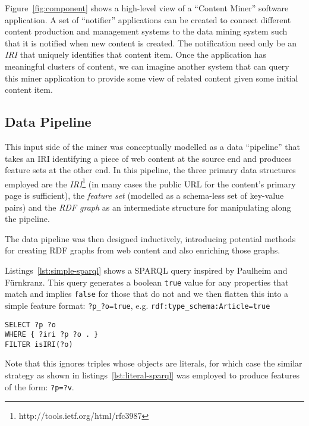 \documentclass{sig-alternate-05-2015}
\begin{document}
Figure~\ref{fig:component} shows a high-level view of a ``Content Miner''
software application. A set of ``notifier''
applications can be created to connect different content production and
management systems to the data mining system such that it is notified when new
content is created. The notification need only be an \emph{IRI} that uniquely
identifies that content item. Once the application has meaningful clusters of
content, we can imagine another system that can query this miner application
to provide some view of related content given some initial content item.

\subsection{Data Pipeline}
\label{sec:design-pipeline}

This input side of the miner was conceptually modelled as a data ``pipeline'' that takes
an IRI identifying a piece of web content at the source end and produces
feature sets at the other end. In this pipeline, the three primary data
structures employed are the \emph{IRI}\footnote{http://tools.ietf.org/html/rfc3987}
(in many cases the public URL for the content's primary page is sufficient),
the \emph{feature set} (modelled as a schema-less set of key-value pairs)
and the \emph{RDF graph} as an intermediate structure for manipulating along
the pipeline.

The data pipeline was then designed inductively, introducing potential
methods for creating RDF graphs from web content and also enriching those
graphs.

Listings~\ref{lst:simple-sparql} shows a SPARQL query inspired by Paulheim and F\"urnkranz\cite{paulheim2012unsupervised}.
This
query generates a boolean \texttt{true} value for any properties that match
and implies \texttt{false} for those that do not and we then flatten this into
a simple feature format: \texttt{?p\_?o=true},
e.g. \texttt{rdf:type\_schema:Article=true}

\begin{lstlisting}[label=lst:simple-sparql,caption={Generates field \texttt{content\_?p\_?v} with value \texttt{true}},language=sparql]
SELECT ?p ?o
WHERE { ?iri ?p ?o . }
FILTER isIRI(?o)
\end{lstlisting}

Note that this ignores triples whose objects are literals, for which case the
similar strategy as shown in listings~\ref{lst:literal-sparql} was employed to
produce features of the form: \texttt{?p=?v}.
\end{document}
